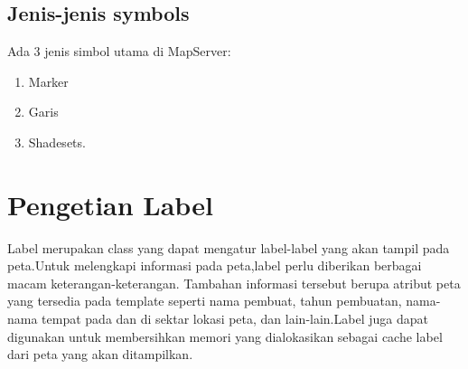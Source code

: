 \subsection {Jenis-jenis symbols}
Ada 3 jenis simbol utama di MapServer: 
\begin{enumerate}
\item Marker
\item Garis 
\item Shadesets.
\end{enumerate}

\section {Pengetian Label}
Label merupakan class yang dapat mengatur label-label yang akan tampil pada peta.Untuk melengkapi informasi pada peta,label perlu diberikan berbagai macam keterangan-keterangan. Tambahan informasi tersebut berupa atribut peta yang tersedia pada template seperti nama pembuat, tahun pembuatan, nama-nama tempat pada dan di sektar lokasi peta, dan lain-lain.Label juga dapat digunakan untuk membersihkan memori yang dialokasikan sebagai cache label dari peta yang akan ditampilkan.
